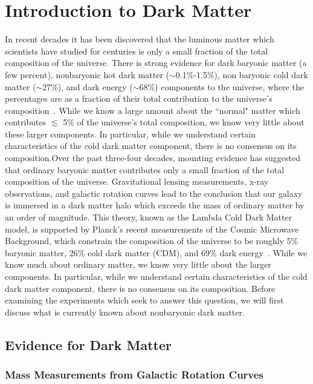 
\section{Introduction to Dark Matter}



In recent decades it has been discovered that the luminous matter which scientists have studied for centuries is only a small fraction of the total composition of the universe.  There is strong evidence for dark baryonic matter (a few percent), nonbaryonic hot dark matter ($\sim$0.1\%-1.5\%), non baryonic cold dark matter ($\sim$27\%), and dark energy ($\sim$68\%) components to the universe, where the percentages are as a fraction of their total contribution to the universe's composition~\cite{Planck}.  While we know a large amount about the ``normal" matter which contributes $ \lesssim $ 5\% of the universe's total composition, we know very little about these larger components.  In particular, while we understand certain characteristics of the cold dark matter component, there is no consensus on its composition.Over the past three-four decades, mounting evidence has suggested that ordinary baryonic matter contributes only a small fraction of the total composition of the universe.  Gravitational lensing measurements,  x-ray observations, and galactic rotation curves lead to the conclusion that our galaxy is immersed in a dark matter halo which exceeds the mass of ordinary matter by an order of magnitude.  This theory, known as the Lambda Cold Dark Matter model, is supported by Planck's recent measurements of the Cosmic Microwave Background, which constrain the composition of the universe to be roughly 5\% baryonic matter, 26\% cold dark matter (CDM), and 69\% dark energy~\cite{Planck}.  While we know much about ordinary matter, we know very little about the larger components.  In particular, while we understand certain characteristics of the cold dark matter component, there is no consensus on its composition.   Before examining the experiments which seek to answer this question, we will first discuss what is currently known about nonbaryonic dark matter.

\subsection{Evidence for Dark Matter}

\subsubsection{Mass Measurements from Galactic Rotation Curves}

